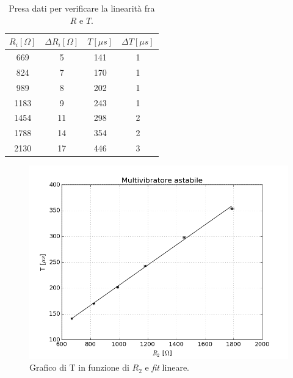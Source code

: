 \documentclass[10pt,a4paper]{article}
\begin{document}
\begin{table}[!htb]
\centering
\begin{tabular}{|c|c|c|c|}
\hline 
$R_i [\Omega]$ & $\Delta R_i [\Omega]$ & $T [\mu s]$ & $\Delta T [\mu s]$\\
\hline
 669 & 5 & 141  & 1\\ 
\hline
 824 &  7 & 170 & 1\\ 
\hline 
 989 &  8 & 202 & 1\\ 
\hline
 1183 &  9 & 243 & 1\\ 
\hline
 1454 &  11 & 298 & 2\\ 
\hline
 1788 & 14 & 354 & 2 \\
\hline
 2130 & 17 & 446 & 3\\
 \hline
\end{tabular} 
\caption{Presa dati per verificare la linearità fra $R$ e $T$.\label{tab:astabile}}
\end{table}



\begin{figure}[!htb]
  \centering
  \includegraphics[scale=0.5]{fitastabile.png}
\caption{Grafico di T in funzione di $R_2$ e \emph{fit} lineare.\label{fit:astabile}}
\end{figure}
\end{document}
